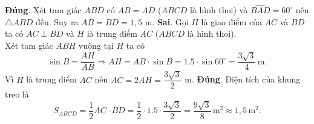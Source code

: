 \begin{ex}
{\begin{itemchoice}
	\itemch \textbf{Đúng}. Xét tam giác $ABD$ có $AB = AD$ ($ABCD$ là hình thoi) và $\widehat{BAD} = 60^\circ$ nên $\triangle ABD$ đều. Suy ra $AB = BD = 1{,}5$ m. 
	\itemch \textbf{Sai}. Gọi $H$ là giao điểm của $AC$ và $BD$ ta có $AC \perp BD$ và $H$ là trung điểm $AC$ ($ABCD$ là hình thoi).\\
	Xét tam giác $ABH$ vuông tại $H$ ta có
	$$\sin B = \dfrac{AH}{AB} \Rightarrow AH = AB \cdot \sin B = 1.5 \cdot \sin 60^\circ = \dfrac{3\sqrt{3}}{4}\,\mathrm{m}.$$
	Vì $H$ là trung điểm $AC$ nên $AC = 2AH = \dfrac{3\sqrt{3}}{2}$ m. 
	\itemch \textbf{Đúng}. Diện tích của khung treo là
	$$S_{ABCD} = \dfrac{1}{2} AC \cdot BD = \dfrac{1}{2} \cdot 1.5 \cdot \dfrac{3\sqrt{3}}{2} = \dfrac{9\sqrt{3}}{8} \,\mathrm{m}^2 \approx 1{,}5\,\mathrm{m}^2.$$
	\end{itemchoice}
	}
\end{ex}
